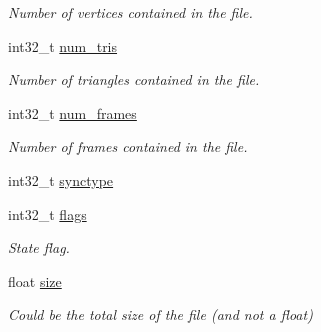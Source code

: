 \begin{DoxyCompactItemize}
\begin{DoxyCompactList}\small\item\em Number of vertices contained in the file. \end{DoxyCompactList}\item 
\hypertarget{struct_assimp_1_1_m_d_l_1_1_header_a8e72c5cac2846245f771b49dcc4fb852}{int32\+\_\+t \hyperlink{struct_assimp_1_1_m_d_l_1_1_header_a8e72c5cac2846245f771b49dcc4fb852}{num\+\_\+tris}}\label{struct_assimp_1_1_m_d_l_1_1_header_a8e72c5cac2846245f771b49dcc4fb852}

\begin{DoxyCompactList}\small\item\em Number of triangles contained in the file. \end{DoxyCompactList}\item 
\hypertarget{struct_assimp_1_1_m_d_l_1_1_header_aecef6c283073980c5f63fadb1025c0ba}{int32\+\_\+t \hyperlink{struct_assimp_1_1_m_d_l_1_1_header_aecef6c283073980c5f63fadb1025c0ba}{num\+\_\+frames}}\label{struct_assimp_1_1_m_d_l_1_1_header_aecef6c283073980c5f63fadb1025c0ba}

\begin{DoxyCompactList}\small\item\em Number of frames contained in the file. \end{DoxyCompactList}\item 
int32\+\_\+t \hyperlink{struct_assimp_1_1_m_d_l_1_1_header_aa04755f2f2d55249fa52f5a8b5f7ad4c}{synctype}
\item 
\hypertarget{struct_assimp_1_1_m_d_l_1_1_header_a6d7e2d6efb3076cc515e6a643b114e48}{int32\+\_\+t \hyperlink{struct_assimp_1_1_m_d_l_1_1_header_a6d7e2d6efb3076cc515e6a643b114e48}{flags}}\label{struct_assimp_1_1_m_d_l_1_1_header_a6d7e2d6efb3076cc515e6a643b114e48}

\begin{DoxyCompactList}\small\item\em State flag. \end{DoxyCompactList}\item 
\hypertarget{struct_assimp_1_1_m_d_l_1_1_header_aee5ed187d403071260ab5ec1bf7bee35}{float \hyperlink{struct_assimp_1_1_m_d_l_1_1_header_aee5ed187d403071260ab5ec1bf7bee35}{size}}\label{struct_assimp_1_1_m_d_l_1_1_header_aee5ed187d403071260ab5ec1bf7bee35}

\begin{DoxyCompactList}\small\item\em Could be the total size of the file (and not a float) \end{DoxyCompactList}\end{DoxyCompactItemize}


